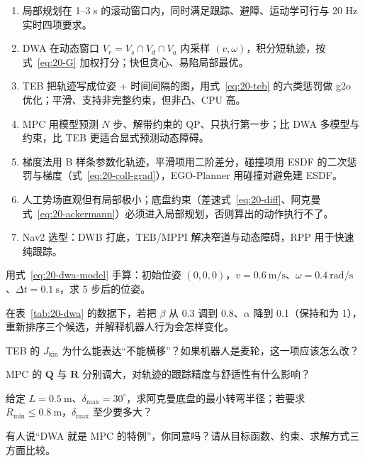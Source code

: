 \begin{summary}

\begin{enumerate}
  \item 局部规划在 1--3 s 的滚动窗口内，同时满足跟踪、避障、运动学可行与 20 Hz 实时四项要求。
  \item DWA 在动态窗口 $V_r=V_s\cap V_d\cap V_a$ 内采样 $(v,\omega)$，积分短轨迹，按式~\eqref{eq:20-G} 加权打分；快但贪心、易陷局部最优。
  \item TEB 把轨迹写成位姿 + 时间间隔的图，用式~\eqref{eq:20-teb} 的六类惩罚做 g2o 优化；平滑、支持非完整约束，但非凸、CPU 高。
  \item MPC 用模型预测 $N$ 步、解带约束的 QP、只执行第一步；比 DWA 多模型与约束，比 TEB 更适合显式预测动态障碍。
  \item 梯度法用 B 样条参数化轨迹，平滑项用二阶差分，碰撞项用 ESDF 的二次惩罚与梯度（式~\eqref{eq:20-coll-grad}），EGO-Planner 用碰撞对避免建 ESDF。
  \item 人工势场直观但有局部极小；底盘约束（差速式~\eqref{eq:20-diff}、阿克曼式~\eqref{eq:20-ackermann}）必须进入局部规划，否则算出的动作执行不了。
  \item Nav2 选型：DWB 打底，TEB/MPPI 解决窄道与动态障碍，RPP 用于快速纯跟踪。
\end{enumerate}


\end{summary}

\begin{problemset}

  \item 用式~\eqref{eq:20-dwa-model} 手算：初始位姿 $(0,0,0)$，$v=0.6\ \mathrm{m/s}$、$\omega=0.4\ \mathrm{rad/s}$、$\Delta t=0.1\ \mathrm{s}$，求 5 步后的位姿。
  \item 在表~\ref{tab:20-dwa} 的数据下，若把 $\beta$ 从 0.3 调到 0.8、$\alpha$ 降到 0.1（保持和为 1），重新排序三个候选，并解释机器人行为会怎样变化。
  \item TEB 的 $J_{\mathrm{kin}}$ 为什么能表达“不能横移”？如果机器人是麦轮，这一项应该怎么改？
  \item MPC 的 $\bm{Q}$ 与 $\bm{R}$ 分别调大，对轨迹的跟踪精度与舒适性有什么影响？
  \item 给定 $L=0.5\ \mathrm{m}$、$\delta_{\max}=30^\circ$，求阿克曼底盘的最小转弯半径；若要求 $R_{\min}\le0.8\ \mathrm{m}$，$\delta_{\max}$ 至少要多大？
  \item 有人说“DWA 就是 MPC 的特例”，你同意吗？请从目标函数、约束、求解方式三方面比较。
\end{problemset}

